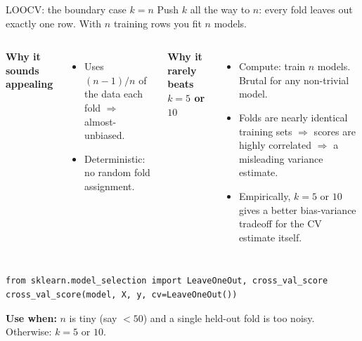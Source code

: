 \documentclass[aspectratio=169]{beamer}
\begin{document}
\begin{frame}[fragile]{LOOCV: the boundary case $k = n$}
  Push $k$ all the way to $n$: every fold leaves out exactly one row. With $n$ training rows you fit $n$ models.
  \vfill
  \begin{columns}[T]
    \textbf{Why it sounds appealing}
    \begin{itemize}\small
      \item Uses $(n-1)/n$ of the data each fold $\Rightarrow$ almost-unbiased.
      \item Deterministic: no random fold assignment.
    \end{itemize}
    \textbf{Why it rarely beats $k = 5$ or $10$}
    \begin{itemize}\small
      \item Compute: train $n$ models. Brutal for any non-trivial model.
      \item Folds are nearly identical training sets $\Rightarrow$ scores are highly correlated $\Rightarrow$ a misleading variance estimate.
      \item Empirically, $k = 5$ or $10$ gives a better bias-variance tradeoff for the CV estimate itself.
    \end{itemize}
  \end{columns}
  \vskip 6pt
{\lstset{basicstyle=\ttfamily\scriptsize}
\begin{lstlisting}
from sklearn.model_selection import LeaveOneOut, cross_val_score
cross_val_score(model, X, y, cv=LeaveOneOut())
\end{lstlisting}}
  \vfill
  \footnotesize \textbf{Use when:} $n$ is tiny (say $< 50$) and a single held-out fold is too noisy. Otherwise: $k = 5$ or $10$.
\end{frame}
\end{document}
